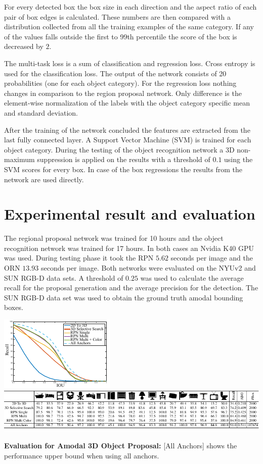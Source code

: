\documentclass[12pt]{scrartcl}
\begin{document}
For every detected box the box size in each direction and the aspect ratio of
each pair of box edges is calculated. These numbers are then compared with a
distribution collected from all the training examples of the same category.
If any of the values falls outside the first to 99th percentile the score
of the box is decreased by \(2\).

The multi-task loss is a sum of classification and regression loss. Cross entropy
is used for the classification loss. The output of the network consists of 20
probabilities (one for each object category). For the regression loss nothing
changes in comparison to the region proposal network. Only difference is the
element-wise normalization of the labels with the object category specific
mean and standard deviation.

After the training of the network concluded the features are extracted from the last
fully connected layer. A Support Vector Machine (SVM) is trained for each object
category. During the testing of the object recognition network a 3D non-maximum
suppression is applied on the results with a threshold of \(0.1\) using the SVM
scores for every box. In case of the box regressions the results from the network
are used directly.

\section{Experimental result and evaluation}

The regional proposal network was trained for 10 hours and the object recognition
network was trained for 17 hours. In both cases an Nvidia K40 GPU was used.
During testing phase it took the RPN \(5.62\) seconds per image and the ORN
\(13.93\) seconds per image. Both networks were evaluated on the NYUv2\cite{Silberman2012}
and SUN RGB-D\cite{Song2015} data sets.
A threshold of \(0.25\) was used to calculate the average recall for the proposal
generation and the average precision for the detection. The SUN RGB-D data set
was used to obtain the ground truth amodal bounding boxes.

\begin{table}
    \includegraphics[scale=0.85]{results-drawing-1}
    \includegraphics[scale=0.85]{results-table-1}
    \caption{\textbf{Evaluation for Amodal 3D Object Proposal:} [All Anchors] shows
    the performance upper bound when using all anchors.}
    \label{tab:results-object-proposal}
\end{table}
\end{document}
